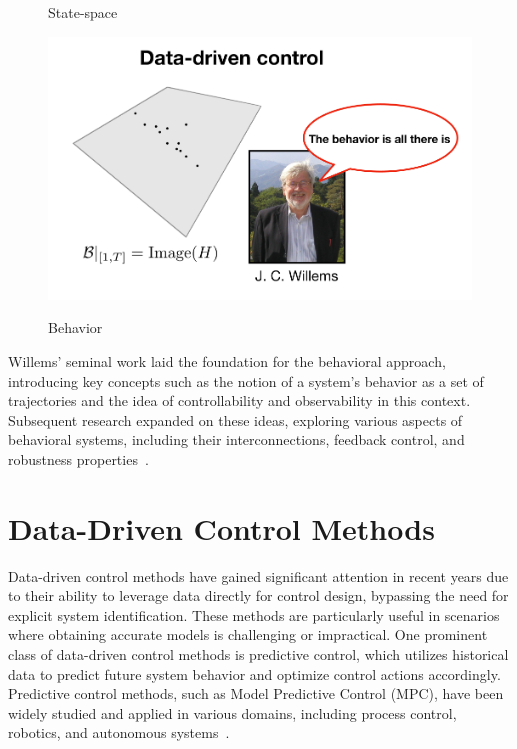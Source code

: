 \begin{figure}[h]
\begin{minipage}{0.32\textwidth}
            \parbox{\linewidth}{\centering\small State-space}
        \end{minipage}\hfill
        \begin{minipage}{0.32\textwidth}
            \centering
            \includegraphics[width=\linewidth, trim={0cm 0cm 0cm 3cm}, clip]{figures/behavior.png}
            \parbox{\linewidth}{\centering\small Behavior}
        \end{minipage}
    \end{figure}

Willems' seminal work laid the foundation for the behavioral approach, introducing key concepts such as the notion of a system's behavior as a set of trajectories and the idea of controllability and observability in this context. Subsequent research expanded on these ideas, exploring various aspects of behavioral systems, including their interconnections, feedback control, and robustness properties~\cite{willems1989,padoan2022}.

\section{Data-Driven Control Methods}
Data-driven control methods have gained significant attention in recent years due to their ability to leverage data directly for control design, bypassing the need for explicit system identification. These methods are particularly useful in scenarios where obtaining accurate models is challenging or impractical. One prominent class of data-driven control methods is predictive control, which utilizes historical data to predict future system behavior and optimize control actions accordingly. Predictive control methods, such as Model Predictive Control (MPC), have been widely studied and applied in various domains, including process control, robotics, and autonomous systems~\cite{camacho2007}.

